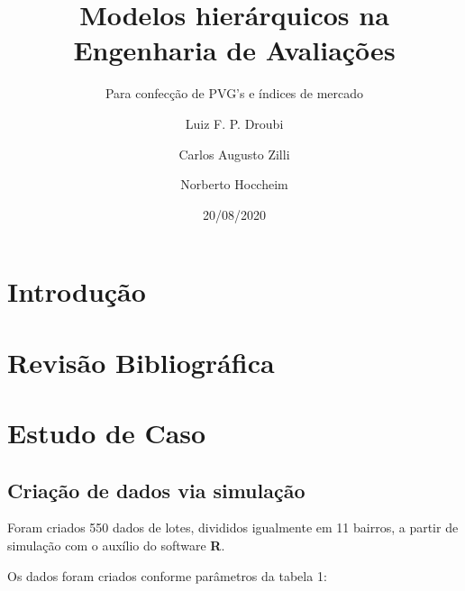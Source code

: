 \documentclass[
  a4paper, 12pt]{article}
\title{Modelos hierárquicos na Engenharia de Avaliações}
\subtitle{Para confecção de PVG's e índices de mercado}
\author{Luiz F. P. Droubi \and Carlos Augusto Zilli \and Norberto Hoccheim}
\date{20/08/2020}
\begin{document}
\maketitle

\hypertarget{introduuxe7uxe3o}{%
\section{Introdução}\label{introduuxe7uxe3o}}

\hypertarget{revisuxe3o-bibliogruxe1fica}{%
\section{Revisão Bibliográfica}\label{revisuxe3o-bibliogruxe1fica}}

\hypertarget{estudo-de-caso}{%
\section{Estudo de Caso}\label{estudo-de-caso}}

\hypertarget{criauxe7uxe3o-de-dados-via-simulauxe7uxe3o}{%
\subsection{Criação de dados via
simulação}\label{criauxe7uxe3o-de-dados-via-simulauxe7uxe3o}}

Foram criados 550 dados de lotes, divididos igualmente em 11 bairros, a
partir de simulação com o auxílio do software \textbf{R}.

Os dados foram criados conforme parâmetros da tabela 1:
\end{document}
